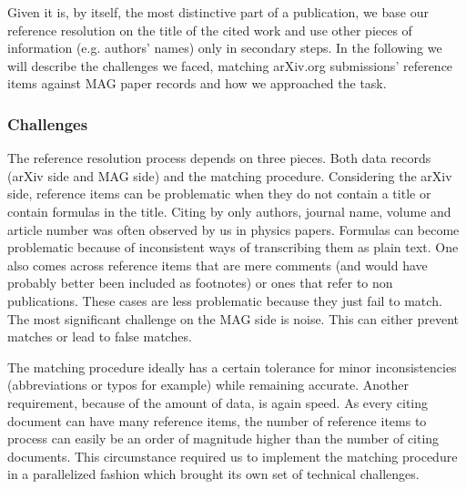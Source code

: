 Given it is, by itself, the most distinctive part of a publication, we base our reference resolution on the title of the cited work and use other pieces of information (e.g. authors' names) only in secondary steps. In the following we will describe the challenges we faced, matching arXiv.org submissions' reference items against MAG paper records and how we approached the task.
\subsubsection{Challenges}
The reference resolution process depends on three pieces. Both data records (arXiv side and MAG side) and the matching procedure. Considering the arXiv side, reference items can be problematic when they do not contain a title or contain formulas in the title. Citing by only authors, journal name, volume and article number was often observed by us in physics papers. Formulas can become problematic because of inconsistent ways of transcribing them as plain text. One also comes across reference items that are mere comments (and would have probably better been included as footnotes) or ones that refer to non publications. These cases are less problematic because they just fail to match. The most significant challenge on the MAG side is noise. This can either prevent matches or lead to false matches.

The matching procedure ideally has a certain tolerance for minor inconsistencies (abbreviations or typos for example) while remaining accurate. Another requirement, because of the amount of data, is again speed. As every citing document can have many reference items, the number of reference items to process can easily be an order of magnitude higher than the number of citing documents. This circumstance required us to implement the matching procedure in a parallelized fashion which brought its own set of technical challenges.

